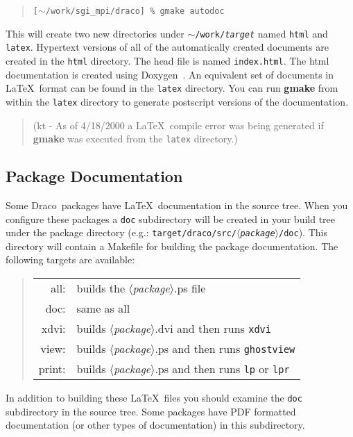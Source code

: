 \documentclass[10pt]{nmemo}
\newcommand{\comp}[1]{\normalfont\normalsize\texttt{#1}}
\newcommand{\draco}{{\normalfont\sffamily Draco}}
\begin{document}
\footnotesize
\begin{verse}
\texttt{[$\sim$/work/sgi\_mpi/draco] \% gmake autodoc}
\end{verse}
\normalsize

This will create two new directories under
\comp{$\sim$/work/\emph{target}} named \comp{html} and \comp{latex}.
Hypertext versions of all of the automatically created documents are
created in the \comp{html} directory.  The head file is named
\comp{index.html}.  The html documentation is created using
Doxygen~\cite{doxygen}.  An equivalent set of documents in \LaTeX\ 
format can be found in the \comp{latex} directory.  You can run
\textbf{gmake} from within the \comp{latex} directory to generate
postscript versions of the documentation.  

\begin{verse}
(kt - As of 4/18/2000 a \LaTeX\ compile error was being generated if
\textbf{gmake} was executed from the \comp{latex} directory.)
\end{verse}

\subsection{Package Documentation}

Some \draco\ packages have \LaTeX\ documentation in the source tree.
When you configure these packages a \comp{doc} subdirectory will be
created in your build tree under the package directory (e.g.:
\comp{target/draco/src/$\langle$\emph{package}$\rangle$/doc}).  This directory will
contain a Makefile for building the package documentation.  The
following targets are available:

\begin{quote}
\begin{tabular}{rl}
all:    &  builds the $\langle$\emph{package}$\rangle$.ps file \\
doc:    &  same as all \\
xdvi:   &  builds $\langle$\emph{package}$\rangle$.dvi and then runs \comp{xdvi} \\
view:   &  builds $\langle$\emph{package}$\rangle$.ps and then runs \comp{ghostview} \\
print:  &  builds $\langle$\emph{package}$\rangle$.ps and then runs \comp{lp} or \comp{lpr}
\end{tabular}
\end{quote}

In addition to building these \LaTeX\ files you should examine the
\comp{doc} subdirectory in the source tree.  Some packages have PDF
formatted documentation (or other types of documentation) in this
subdirectory. 
\end{document}
